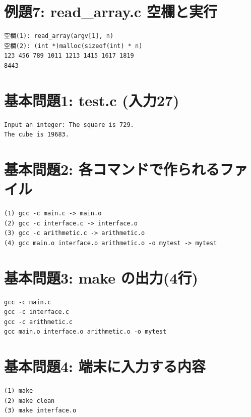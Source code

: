 \documentclass[uplatex,dvipdfmx,a4paper,11pt]{jsarticle}
\begin{document}
\section*{例題7: read\_array.c 空欄と実行}
\begin{Verbatim}[fontsize=\small,frame=single]
空欄(1): read_array(argv[1], n)
空欄(2): (int *)malloc(sizeof(int) * n)
123 456 789 1011 1213 1415 1617 1819 
8443
\end{Verbatim}
\section*{基本問題1: test.c (入力27)}
\begin{Verbatim}[fontsize=\small,frame=single]
Input an integer: The square is 729.
The cube is 19683.
\end{Verbatim}
\section*{基本問題2: 各コマンドで作られるファイル}
\begin{Verbatim}[fontsize=\small,frame=single]
(1) gcc -c main.c -> main.o
(2) gcc -c interface.c -> interface.o
(3) gcc -c arithmetic.c -> arithmetic.o
(4) gcc main.o interface.o arithmetic.o -o mytest -> mytest
\end{Verbatim}
\section*{基本問題3: make の出力(4行)}
\begin{Verbatim}[fontsize=\small,frame=single]
gcc -c main.c
gcc -c interface.c
gcc -c arithmetic.c
gcc main.o interface.o arithmetic.o -o mytest
\end{Verbatim}
\section*{基本問題4: 端末に入力する内容}
\begin{Verbatim}[fontsize=\small,frame=single]
(1) make
(2) make clean
(3) make interface.o
\end{Verbatim}
\end{document}

